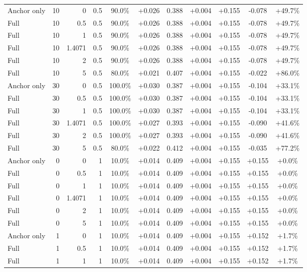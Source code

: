 \begin{table}[htbp]
\begin{tabular}{lrrrccccccc}
Anchor only & 10 & 0 & 0.5 & 90.0\% & +0.026 & 0.388 & +0.004 & +0.155 & -0.078 & +49.7\% \\
Full & 10 & 0.5 & 0.5 & 90.0\% & +0.026 & 0.388 & +0.004 & +0.155 & -0.078 & +49.7\% \\
Full & 10 & 1 & 0.5 & 90.0\% & +0.026 & 0.388 & +0.004 & +0.155 & -0.078 & +49.7\% \\
Full & 10 & 1.4071 & 0.5 & 90.0\% & +0.026 & 0.388 & +0.004 & +0.155 & -0.078 & +49.7\% \\
Full & 10 & 2 & 0.5 & 90.0\% & +0.026 & 0.388 & +0.004 & +0.155 & -0.078 & +49.7\% \\
Full & 10 & 5 & 0.5 & 80.0\% & +0.021 & 0.407 & +0.004 & +0.155 & -0.022 & +86.0\% \\
Anchor only & 30 & 0 & 0.5 & 100.0\% & +0.030 & 0.387 & +0.004 & +0.155 & -0.104 & +33.1\% \\
Full & 30 & 0.5 & 0.5 & 100.0\% & +0.030 & 0.387 & +0.004 & +0.155 & -0.104 & +33.1\% \\
Full & 30 & 1 & 0.5 & 100.0\% & +0.030 & 0.387 & +0.004 & +0.155 & -0.104 & +33.1\% \\
Full & 30 & 1.4071 & 0.5 & 100.0\% & +0.027 & 0.393 & +0.004 & +0.155 & -0.090 & +41.6\% \\
Full & 30 & 2 & 0.5 & 100.0\% & +0.027 & 0.393 & +0.004 & +0.155 & -0.090 & +41.6\% \\
Full & 30 & 5 & 0.5 & 80.0\% & +0.022 & 0.412 & +0.004 & +0.155 & -0.035 & +77.2\% \\
Anchor only & 0 & 0 & 1 & 10.0\% & +0.014 & 0.409 & +0.004 & +0.155 & +0.155 & +0.0\% \\
Full & 0 & 0.5 & 1 & 10.0\% & +0.014 & 0.409 & +0.004 & +0.155 & +0.155 & +0.0\% \\
Full & 0 & 1 & 1 & 10.0\% & +0.014 & 0.409 & +0.004 & +0.155 & +0.155 & +0.0\% \\
Full & 0 & 1.4071 & 1 & 10.0\% & +0.014 & 0.409 & +0.004 & +0.155 & +0.155 & +0.0\% \\
Full & 0 & 2 & 1 & 10.0\% & +0.014 & 0.409 & +0.004 & +0.155 & +0.155 & +0.0\% \\
Full & 0 & 5 & 1 & 10.0\% & +0.014 & 0.409 & +0.004 & +0.155 & +0.155 & +0.0\% \\
Anchor only & 1 & 0 & 1 & 10.0\% & +0.014 & 0.409 & +0.004 & +0.155 & +0.152 & +1.7\% \\
Full & 1 & 0.5 & 1 & 10.0\% & +0.014 & 0.409 & +0.004 & +0.155 & +0.152 & +1.7\% \\
Full & 1 & 1 & 1 & 10.0\% & +0.014 & 0.409 & +0.004 & +0.155 & +0.152 & +1.7\% \\

\end{tabular}
\end{table}
